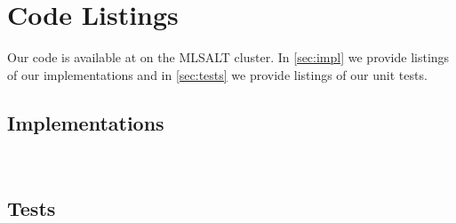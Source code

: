 \documentclass[a4paper,oneside,reqno]{amsart}
\begin{document}

\nocite{*}


\appendix

\section{Code Listings}

Our code is available at  on the MLSALT cluster.
In \autoref{sec:impl} we provide listings of our implementations and in
\autoref{sec:tests} we provide listings of our unit tests.

\subsection{Implementations}\label{sec:impl}~\\












\subsection{Tests}\label{sec:tests}~\\








\end{document}

